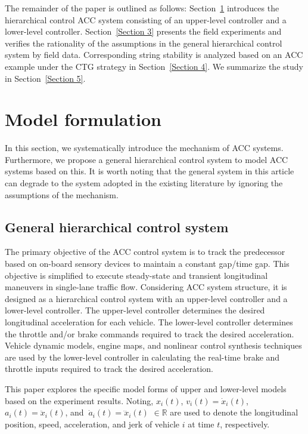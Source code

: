 \documentclass[journal]{IEEEtran}
\begin{document}
The remainder of the paper is outlined as follows: Section~\ref{Section 2} introduces the hierarchical control ACC system consisting of an upper-level controller and a lower-level controller. Section~\ref{Section 3} presents the field experiments and verifies the rationality of the assumptions in the general hierarchical control system by field data. Corresponding string stability is analyzed based on an ACC example under the CTG strategy in Section~\ref{Section 4}. We summarize the study in Section~\ref{Section 5}.



\section{Model formulation}
\label{Section 2}
In this section, we systematically introduce the mechanism of ACC systems. Furthermore, we propose a general hierarchical control system to model ACC systems based on this. It is worth noting that the general system in this article can degrade to the system adopted in the existing literature by ignoring the assumptions of the mechanism.

\subsection{General hierarchical control system}
\label{Section 2.1}


The primary objective of the ACC control system is to track the predecessor based on on-board sensory devices to maintain a constant gap/time gap. This objective is simplified to execute steady-state and transient longitudinal maneuvers in single-lane traffic flow. Considering ACC system structure, it is designed as a hierarchical control system with an upper-level controller and a lower-level controller. The upper-level controller determines the desired longitudinal acceleration for each vehicle. The lower-level controller determines the throttle and/or brake commands required to track the desired acceleration. Vehicle dynamic models, engine maps, and nonlinear control synthesis techniques \citep{Choi1995,Choi1995a,Hedrick1991,Hedrick1993} are used by the lower-level controller in calculating the real-time brake and throttle inputs required to track the desired acceleration.

This paper explores the specific model forms of upper and lower-level models based on the experiment results. Noting, $x_i\left(t\right)$, $v_i\left(t\right)={\dot{x}}_i\left(t\right)$, $a_i\left(t\right)={\ddot{x}}_i\left(t\right)$, and $\ {\dot{a}}_i\left(t\right)={\dddot{x}}_i\left(t\right)$ $\in\mathbb{R}$ are used to denote the longitudinal position, speed, acceleration, and jerk of vehicle $i$ at time $t$, respectively.
\end{document}
